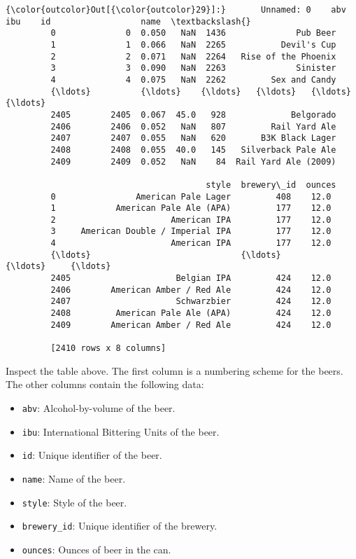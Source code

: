 \documentclass[11pt]{article}
\providecommand{\tightlist}{%
      \setlength{\itemsep}{0pt}\setlength{\parskip}{0pt}}
\begin{document}
\begin{Verbatim}[commandchars=\\\{\}]
{\color{outcolor}Out[{\color{outcolor}29}]:}       Unnamed: 0    abv   ibu    id                  name  \textbackslash{}
         0              0  0.050   NaN  1436              Pub Beer   
         1              1  0.066   NaN  2265           Devil's Cup   
         2              2  0.071   NaN  2264   Rise of the Phoenix   
         3              3  0.090   NaN  2263              Sinister   
         4              4  0.075   NaN  2262         Sex and Candy   
         {\ldots}          {\ldots}    {\ldots}   {\ldots}   {\ldots}                   {\ldots}   
         2405        2405  0.067  45.0   928             Belgorado   
         2406        2406  0.052   NaN   807         Rail Yard Ale   
         2407        2407  0.055   NaN   620       B3K Black Lager   
         2408        2408  0.055  40.0   145   Silverback Pale Ale   
         2409        2409  0.052   NaN    84  Rail Yard Ale (2009)   
         
                                        style  brewery\_id  ounces  
         0                American Pale Lager         408    12.0  
         1            American Pale Ale (APA)         177    12.0  
         2                       American IPA         177    12.0  
         3     American Double / Imperial IPA         177    12.0  
         4                       American IPA         177    12.0  
         {\ldots}                              {\ldots}         {\ldots}     {\ldots}  
         2405                     Belgian IPA         424    12.0  
         2406        American Amber / Red Ale         424    12.0  
         2407                     Schwarzbier         424    12.0  
         2408         American Pale Ale (APA)         424    12.0  
         2409        American Amber / Red Ale         424    12.0  
         
         [2410 rows x 8 columns]
\end{Verbatim}
            
    Inspect the table above. The first column is a numbering scheme for the
beers. The other columns contain the following data:

\begin{itemize}
\tightlist
\item
  \texttt{abv}: Alcohol-by-volume of the beer.
\item
  \texttt{ibu}: International Bittering Units of the beer.
\item
  \texttt{id}: Unique identifier of the beer.
\item
  \texttt{name}: Name of the beer.
\item
  \texttt{style}: Style of the beer.
\item
  \texttt{brewery\_id}: Unique identifier of the brewery.
\item
  \texttt{ounces}: Ounces of beer in the can.
\end{itemize}
\end{document}

